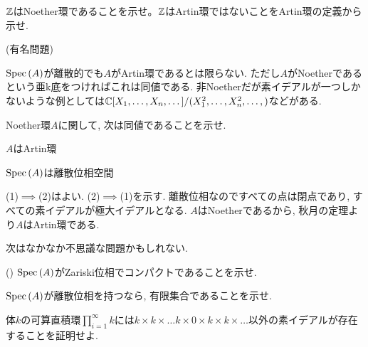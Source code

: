 

\begin{prac}
$\mathbb{Z}$はNoether環であることを示せ。$\mathbb{Z}$はArtin環ではないことをArtin環の定義から示せ.
\end{prac}
\begin{prac} (有名問題)
\end{prac}

\begin{rem}
$\mathrm{Spec}\left( A \right)$が離散的でも$A$がArtin環であるとは限らない. ただし$A$がNoetherであるという亜k底をつければこれは同値である. 非Noetherだが素イデアルが一つしかないような例としては$\mathbb{C}[X_1,\dots, X_n,\dots]/(X_1^2,\dots, X_n^2,\dots,)$などがある.
\end{rem}

\begin{egprob}
Noether環$A$に関して, 次は同値であることを示せ.
\ben
\item $A$はArtin環
\item $\mathrm{Spec}\left( A \right)$は離散位相空間
\een
\end{egprob}
\begin{egans}
(1)$\implies$(2)はよい. (2)$\implies$(1)を示す.  離散位相なのですべての点は閉点であり, すべての素イデアルが極大イデアルとなる. $A$はNoetherであるから, 秋月の定理より$A$はArtin環である.
\end{egans}


次はなかなか不思議な問題かもしれない.
\begin{egprob}
\ben
\item () $\mathrm{Spec}\left( A \right)$がZariski位相でコンパクトであることを示せ.
\item $\mathrm{Spec}\left( A \right)$が離散位相を持つなら, 有限集合であることを示せ.
\item 体$k$の可算直積環$\prod_{i=1}^{\infty} k$には$k\times k\times \dots k \times 0 \times k\times k\times \dots$以外の素イデアルが存在することを証明せよ.
\een
\end{egprob}




